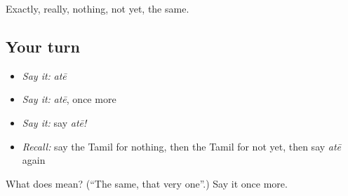 \begin{grammarlens}[title={What you've built}]
Exactly, really, nothing, not yet, the same.
\end{grammarlens}

\subsection*{Your turn}
\begin{itemize}
\raggedright
  \item \emph{Say it:} \emph{atē}
  \item \emph{Say it:} \emph{atē}, once more
  \item \emph{Say it:} say \emph{atē!}
  \item \emph{Recall:} say the Tamil for nothing, then the Tamil for not yet, then say \emph{atē} again
\end{itemize}

\begin{tcolorbox}[breakable,colback=teal!4,colframe=teal!35!black,title={Before you move on}]
What does  mean? (\textquotedblleft{}The same, that very one\textquotedblright{}.) Say it once more.
\end{tcolorbox}
